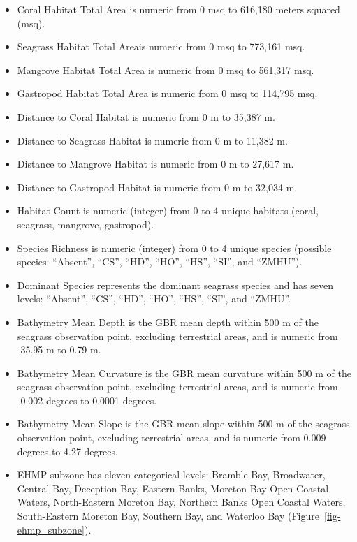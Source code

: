 \documentclass[
  letterpaper,
  DIV=11,
  numbers=noendperiod]{scrartcl}
\providecommand{\tightlist}{%
  \setlength{\itemsep}{0pt}\setlength{\parskip}{0pt}}
\begin{document}
\begin{itemize}
\tightlist
\item
  Coral Habitat Total Area is numeric from 0 msq to 616,180 meters
  squared (msq).
\item
  Seagrass Habitat Total Areais numeric from 0 msq to 773,161 msq.
\item
  Mangrove Habitat Total Area is numeric from 0 msq to 561,317 msq.
\item
  Gastropod Habitat Total Area is numeric from 0 msq to 114,795 msq.
\item
  Distance to Coral Habitat is numeric from 0 m to 35,387 m.
\item
  Distance to Seagrass Habitat is numeric from 0 m to 11,382 m.
\item
  Distance to Mangrove Habitat is numeric from 0 m to 27,617 m.
\item
  Distance to Gastropod Habitat is numeric from 0 m to 32,034 m.
\item
  Habitat Count is numeric (integer) from 0 to 4 unique habitats (coral,
  seagrass, mangrove, gastropod).
\item
  Species Richness is numeric (integer) from 0 to 4 unique species
  (possible species: ``Absent'', ``CS'', ``HD'', ``HO'', ``HS'', ``SI'',
  and ``ZMHU'').
\item
  Dominant Species represents the dominant seagrass species and has
  seven levels: ``Absent'', ``CS'', ``HD'', ``HO'', ``HS'', ``SI'', and
  ``ZMHU''.
\item
  Bathymetry Mean Depth is the GBR mean depth within 500 m of the
  seagrass observation point, excluding terrestrial areas, and is
  numeric from -35.95 m to 0.79 m.
\item
  Bathymetry Mean Curvature is the GBR mean curvature within 500 m of
  the seagrass observation point, excluding terrestrial areas, and is
  numeric from -0.002 degrees to 0.0001 degrees.
\item
  Bathymetry Mean Slope is the GBR mean slope within 500 m of the
  seagrass observation point, excluding terrestrial areas, and is
  numeric from 0.009 degrees to 4.27 degrees.
\item
  EHMP subzone has eleven categorical levels: Bramble Bay, Broadwater,
  Central Bay, Deception Bay, Eastern Banks, Moreton Bay Open Coastal
  Waters, North-Eastern Moreton Bay, Northern Banks Open Coastal Waters,
  South-Eastern Moreton Bay, Southern Bay, and Waterloo Bay
  (Figure~\ref{fig-ehmp_subzone}).
\end{itemize}
\end{document}
